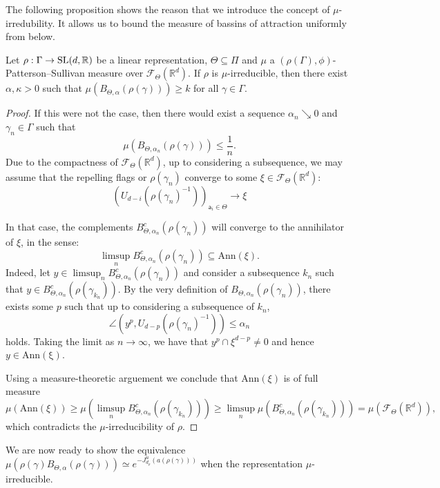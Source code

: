 \documentclass{report}
\begin{document}
The following proposition shows the reason that we introduce the concept of $\mu$-irredubility.
It allows us to bound the measure of bassins of attraction uniformly from below.
\begin{proposition}\label{prop:irreducibility}
    Let $\rho: \Gamma \to \operatorname{{\mathrm{SL}}}(d,\mathbb R)$ be a linear representation, $\Theta \subseteq \Pi$ and $\mu$ a $(\rho(\Gamma), \phi)$-Patterson--Sullivan measure over $\mathcal F_\Theta(\mathbb R^d)$.
    If $\rho$ is $\mu$-irreducible, then there exist $\alpha, \kappa > 0$ such that $\mu(B_{\Theta, \alpha}(\rho(\gamma))) \geq k$ for all $\gamma \in \Gamma$.
\end{proposition}
\begin{proof}
    If this were not the case, then there would exist a sequence $\alpha_n \searrow 0$ and $\gamma_n \in \Gamma$ such that
    \[
        \mu(B_{\Theta, \alpha_n}(\rho(\gamma))) \leq \frac{1}{n}.
    \]
    Due to the compactness of $\mathcal F_{\Theta} (\mathbb R^d)$, up to considering a subsequence, we may assume that the repelling flags or $\rho(\gamma_n)$ converge to some $\xi \in \mathcal F_{\Theta} (\mathbb R^d)$:
    \[
        (U_{d-i}(\rho(\gamma_n)^{-1}))_{\mathsf a_i \in \Theta} \to \xi
    \]
    
    In that case, the complements $B_{\Theta, \alpha_n}^c(\rho(\gamma_n))$ will converge to the annihilator of $\xi$, in the sense:
    \[
        \limsup_n B_{\Theta, \alpha_n}^c(\rho(\gamma_n)) \subseteq \mathrm{Ann}(\xi).
    \]
    Indeed, let $y\in \limsup_n  B_{\Theta, \alpha_n}^c(\rho(\gamma_n))$ and consider a subsequence $k_n$ such that $y\in B_{\Theta, \alpha_n}^c(\rho(\gamma_{k_n}))$.
    By the very definition of $B_{\Theta, \alpha_n}(\rho(\gamma_n))$, there exists some $p$ such that up to considering a subsequence of $k_n$,
    \[
        \angle (y^p, U_{d-p}(\rho(\gamma_n)^{-1})) \leq \alpha_n
    \]
    holds.
    Taking the limit as $n \to \infty$, we have that $y^p \cap \xi^{d-p} \neq 0$ and hence $y \in \mathrm{Ann(\xi)}$.

    Using a measure-theoretic arguement we conclude that $\mathrm{Ann}(\xi)$ is of full measure
    \[
        \mu(\mathrm{Ann}(\xi)) \geq
        \mu (\limsup_n B_{\Theta, \alpha_n}^c(\rho(\gamma_{k_n})) ) \geq 
        \limsup_n \mu (B_{\Theta, \alpha_n}^c(\rho(\gamma_{k_n}))) =
        \mu(\mathcal F_\Theta (\mathbb R^d)),
    \]
    which contradicts the $\mu$-irreducibility of $\rho$.
\end{proof}
We are now ready to show the equivalence $\mu(\rho(\gamma)B_{\Theta, \alpha}(\rho(\gamma))) \simeq e^{-J^u_{d_\rho}(a(\rho(\gamma)))}$ when the representation $\mu$-irreducible.
\end{document}
